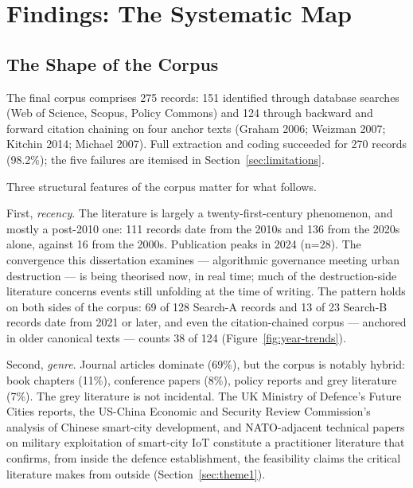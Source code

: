 
\chapter{Findings: The Systematic Map}
\label{ch:findings}

\section{The Shape of the Corpus}
\label{sec:shape}

The final corpus comprises 275 records: 151 identified through database searches (Web of Science, Scopus, Policy Commons) and 124 through backward and forward citation chaining on four anchor texts (Graham 2006; Weizman 2007; Kitchin 2014; Michael 2007). Full extraction and coding succeeded for 270 records (98.2\%); the five failures are itemised in Section~\ref{sec:limitations}.

Three structural features of the corpus matter for what follows.

First, \textit{recency}. The literature is largely a twenty-first-century phenomenon, and mostly a post-2010 one: 111 records date from the 2010s and 136 from the 2020s alone, against 16 from the 2000s. Publication peaks in 2024 (n=28). The convergence this dissertation examines — algorithmic governance meeting urban destruction — is being theorised now, in real time; much of the destruction-side literature concerns events still unfolding at the time of writing. The pattern holds on both sides of the corpus: 69 of 128 Search-A records and 13 of 23 Search-B records date from 2021 or later, and even the citation-chained corpus — anchored in older canonical texts — counts 38 of 124 (Figure~\ref{fig:year-trends}).

Second, \textit{genre}. Journal articles dominate (69\%), but the corpus is notably hybrid: book chapters (11\%), conference papers (8\%), policy reports and grey literature (7\%). The grey literature is not incidental. The UK Ministry of Defence's Future Cities reports, the US-China Economic and Security Review Commission's analysis of Chinese smart-city development, and NATO-adjacent technical papers on military exploitation of smart-city IoT constitute a practitioner literature that confirms, from inside the defence establishment, the feasibility claims the critical literature makes from outside (Section~\ref{sec:theme1}).

